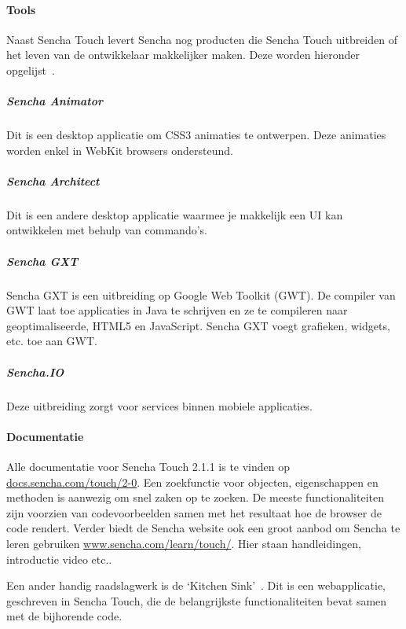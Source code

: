 \paragraph{Tools}
Naast Sencha Touch levert Sencha nog producten die Sencha Touch uitbreiden of het leven van de ontwikkelaar makkelijker maken.  Deze worden hieronder opgelijst~\cite{Inc.}.  

\subparagraph{Sencha Animator}
Dit is een desktop applicatie om CSS3 animaties te ontwerpen.  Deze animaties worden enkel in WebKit browsers ondersteund.

\subparagraph{Sencha Architect}
Dit is een andere desktop applicatie waarmee je makkelijk een UI kan ontwikkelen met behulp van  commando's.  

\subparagraph{Sencha GXT}
Sencha GXT is een uitbreiding op Google Web Toolkit (GWT).  De compiler van GWT laat toe applicaties in Java te schrijven en ze te compileren naar geoptimaliseerde,   HTML5 en JavaScript.  Sencha GXT voegt grafieken,  widgets, etc. toe aan GWT.

\subparagraph{Sencha.IO}
Deze uitbreiding zorgt voor  services binnen mobiele applicaties.  

\paragraph{Documentatie}
Alle documentatie voor Sencha Touch 2.1.1 is te vinden op \url{docs.sencha.com/touch/2-0}.  Een zoekfunctie voor objecten,  eigenschappen en methoden is aanwezig om snel zaken op te zoeken.  De meeste functionaliteiten zijn voorzien van codevoorbeelden samen met het resultaat hoe de browser de code rendert.  Verder biedt de Sencha website ook een groot aanbod om Sencha te leren gebruiken \url{www.sencha.com/learn/touch/}.  Hier staan handleidingen,  introductie video etc..

Een ander handig raadslagwerk is de ‘Kitchen Sink'~\cite{Inc.2013}.  Dit is een webapplicatie,  geschreven in Sencha Touch,  die de belangrijkste functionaliteiten bevat samen met de bijhorende code.  



